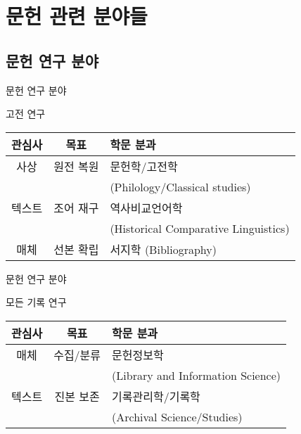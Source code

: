 \documentclass[11pt, aspectratio=169]{beamer}
\begin{document}
\section{문헌 관련 분야들}

\subsection{문헌 연구 분야}
\begin{frame}[t]{문헌 연구 분야}
  \begin{block}{고전 연구}
      \begin{tabular}{ccl}
        \textbf{관심사} & \textbf{목표}  & \textbf{학문 분과} \\
        \hline
        사상 & 원전 복원 & 문헌학/고전학 \\
         & & (Philology/Classical studies)\\
        텍스트 & 조어 재구 & 역사비교언어학  \\
         & & (Historical Comparative Linguistics) \\
        매체 & 선본 확립 & 서지학 (Bibliography) \\
      \end{tabular}        
  \end{block}
\end{frame}

\begin{frame}[t]{문헌 연구 분야}
  \begin{block}{모든 기록 연구}
      \begin{tabular}{ccl}
        \textbf{관심사} & \textbf{목표}  & \textbf{학문 분과} \\
        \hline
        매체 & 수집/분류 & 문헌정보학 \\
         & & (Library and Information Science)\\
        텍스트 & 진본 보존 & 기록관리학/기록학  \\
         & & (Archival Science/Studies) \\
      \end{tabular}        
  \end{block}
\end{frame}
\end{document}
